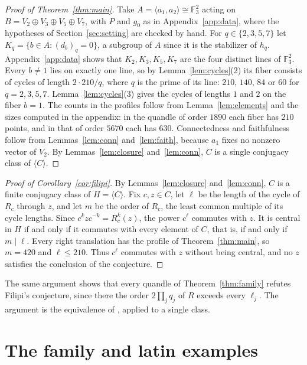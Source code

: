 \documentclass[11pt]{article}
\newcommand{\F}{\mathbb{F}}
\begin{document}
\begin{proof}[Proof of Theorem~\ref{thm:main}]
Take $A=\langle a_1,a_2\rangle\cong\F_3^2$ acting on
$B=V_2\oplus V_3\oplus V_5\oplus V_7$, with $P$ and $g_0$ as in
Appendix~\ref{app:data}, where the hypotheses of Section~\ref{sec:setting}
are checked by hand. For $q\in\{2,3,5,7\}$ let $K_q=\{b\in A:(d_b)_q=0\}$,
a subgroup of $A$ since it is the stabilizer of $h_q$. Appendix~\ref{app:data}
shows that $K_2,K_3,K_5,K_7$ are the four distinct lines of $\F_3^2$. Every
$b\ne1$ lies on exactly one line, so by Lemma~\ref{lem:cycles}(2) its fiber
consists of cycles of length $2\cdot210/q$, where $q$ is the prime of its
line: $210$, $140$, $84$ or $60$ for $q=2,3,5,7$. Lemma~\ref{lem:cycles}(3)
gives the cycles of lengths $1$ and $2$ on the fiber $b=1$. The counts in
the profiles follow from Lemma~\ref{lem:elements} and the sizes computed
in the appendix: in the quandle of order $1890$ each fiber has $210$
points, and in that of order $5670$ each has $630$. Connectedness and
faithfulness follow from Lemmas~\ref{lem:conn} and~\ref{lem:faith},
because $a_1$ fixes no nonzero vector of $V_2$. By Lemmas~\ref{lem:closure}
and~\ref{lem:conn}, $C$ is a single conjugacy class of $\langle C\rangle$.
\end{proof}

\begin{proof}[Proof of Corollary~\ref{cor:filipi}]
By Lemmas~\ref{lem:closure} and~\ref{lem:conn}, $C$ is a finite conjugacy
class of $H=\langle C\rangle$. Fix $c,z\in C$, let $\ell$ be the length of
the cycle of $R_c$ through $z$, and let $m$ be the order of $R_c$, the
least common multiple of its cycle lengths. Since $c^kzc^{-k}=R_c^k(z)$,
the power $c^\ell$ commutes with $z$. It is central in $H$ if and only if
it commutes with every element of $C$, that is, if and only if $m\mid\ell$.
Every right translation has the profile of Theorem~\ref{thm:main}, so
$m=420$ and $\ell\le210$. Thus $c^\ell$ commutes with $z$ without being
central, and no $z$ satisfies the conclusion of the conjecture.
\end{proof}

The same argument shows that every quandle of Theorem~\ref{thm:family}
refutes Filipi's conjecture, since there the order $2\prod_jq_j$ of $R$
exceeds every $\ell_j$. The argument is the equivalence of
\cite[Theorem~4.1]{F}, applied to a single class.

\section{The family and latin examples}
\end{document}
